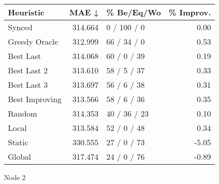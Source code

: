 \begin{tabular}{lrlr}
\toprule
\textbf{Heuristic} & \textbf{MAE ↓} & \textbf{\% Be/Eq/Wo} & \textbf{\% Improv.} \\
\midrule
            Synced &        314.664 &          0 / 100 / 0 &                0.00 \\
     Greedy Oracle &        312.999 &          66 / 34 / 0 &                0.53 \\
         Best Last &        314.068 &          60 / 0 / 39 &                0.19 \\
       Best Last 2 &        313.610 &          58 / 5 / 37 &                0.33 \\
       Best Last 3 &        313.697 &          56 / 6 / 38 &                0.31 \\
    Best Improving &        313.566 &          58 / 6 / 36 &                0.35 \\
            Random &        314.353 &         40 / 36 / 23 &                0.10 \\
             Local &        313.584 &          52 / 0 / 48 &                0.34 \\
            Static &        330.555 &          27 / 0 / 73 &               -5.05 \\
            Global &        317.474 &          24 / 0 / 76 &               -0.89 \\
\bottomrule
\end{tabular}
\caption{Node 2}
\label{tab:non_lr01_le2_bs4_2}
